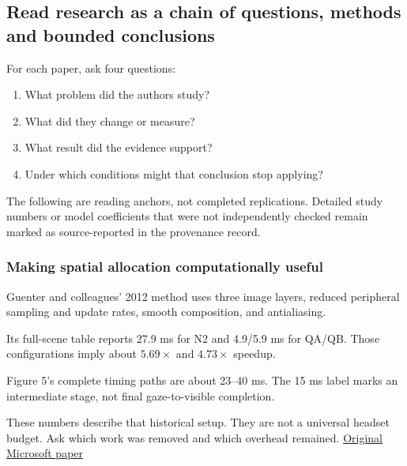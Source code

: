 \subsection{Read research as a chain of questions, methods and bounded conclusions}\label{04-visual-computing-ii-ch043-read-research-as-a-chain-of-questions-methods-and-bounded-conclusions}

\hypertarget{04-visual-computing-ii-ch043-read-research-as-a-chain-of-questions-methods-and-bounded-conclusions}{}

For each paper, ask four questions:

\begin{enumerate}
\def\labelenumi{\arabic{enumi}.}
\tightlist
\item
  What problem did the authors study?
\item
  What did they change or measure?
\item
  What result did the evidence support?
\item
  Under which conditions might that conclusion stop applying?
\end{enumerate}

The following are reading anchors, not completed replications. Detailed study numbers or model coefficients that were not independently checked remain marked as source-reported in the provenance record.

\subsubsection{Making spatial allocation computationally useful}\label{04-visual-computing-ii-ch043-making-spatial-allocation-computationally-useful}

\hypertarget{04-visual-computing-ii-ch043-making-spatial-allocation-computationally-useful}{}

Guenter and colleagues' 2012 method uses three image layers, reduced peripheral sampling and update rates, smooth composition, and antialiasing.

Its full-scene table reports 27.9 ms for N2 and 4.9/5.9 ms for QA/QB. Those configurations imply about \(5.69\times\) and \(4.73\times\) speedup.

Figure 5's complete timing paths are about 23--40 ms. The 15 ms label marks an intermediate stage, not final gaze-to-visible completion.

These numbers describe that historical setup. They are not a universal headset budget. Ask which work was removed and which overhead remained. \href{https://www.microsoft.com/en-us/research/wp-content/uploads/2012/11/foveated_final15.pdf}{Original Microsoft paper}

